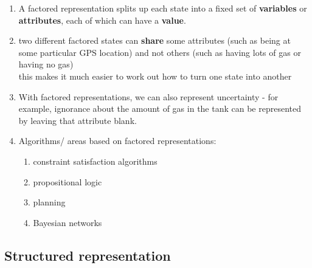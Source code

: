 \begin{enumerate}
    \item A factored representation splits up each state into a fixed set of \textbf{variables} or \textbf{attributes}, each of which can have a \textbf{value}.
    \hfill \cite{ai/book/Artificial-Intelligence-A-Modern-Approach/Russell-Norvig}

    \item two different factored states can \textbf{share} some attributes (such as being at some particular GPS location) and not others (such as having lots of gas or having no gas)
    \\
    this makes it much easier to work out how to turn one state into another
    \hfill \cite{ai/book/Artificial-Intelligence-A-Modern-Approach/Russell-Norvig}

    \item With factored representations, we can also represent uncertainty - for example, ignorance about the amount of gas in the tank can be represented by leaving that attribute blank.
    \hfill \cite{ai/book/Artificial-Intelligence-A-Modern-Approach/Russell-Norvig}

    \item Algorithms/ areas based on factored representations:
    \begin{enumerate}
        \item constraint satisfaction algorithms
        \hfill \cite{ai/book/Artificial-Intelligence-A-Modern-Approach/Russell-Norvig}

        \item propositional logic
        \hfill \cite{ai/book/Artificial-Intelligence-A-Modern-Approach/Russell-Norvig}

        \item planning
        \hfill \cite{ai/book/Artificial-Intelligence-A-Modern-Approach/Russell-Norvig}

        \item Bayesian networks
        \hfill \cite{ai/book/Artificial-Intelligence-A-Modern-Approach/Russell-Norvig}

    \end{enumerate}
\end{enumerate}








\subsection{Structured representation}


